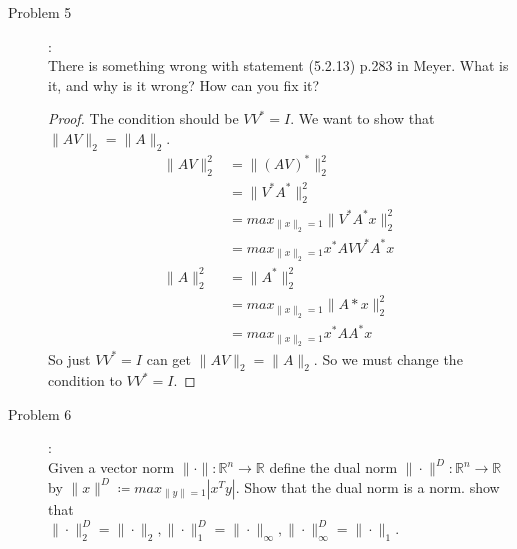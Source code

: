 \documentclass[a4paper]{article}
\begin{document}
\begin{description}
  \item[Problem 5]:\\
   There is something wrong with statement (5.2.13) p.283 in Meyer. What is it, and why is it wrong? How can you fix it?

  \begin{proof}
    The condition should be $VV^{*}=I$. We want to show that $\|AV\|_{2}=\|A\|_{2}$.
    \begin{align*}
      \|AV\|_{2}^{2}&=\|(AV)^{*}\|_{2}^{2} \\
      &=\|V^{*}A^{*}\|_{2}^{2}\\
      &=max_{\|x\|_{2}=1}\|V^{*}A^{*}x\|_{2}^{2}\\
      &=max_{\|x\|_{2}=1} x^{*}AVV^{*}A^{*}x\\
      \|A\|_{2}^{2}&=\|A^{*}\|_{2}^{2}\\
      &=max_{\|x\|_{2}=1}\|A*x\|_{2}^{2}\\
      &=max_{\|x\|_{2}=1}x^{*}AA^{*}x
    \end{align*}
    So just $VV^{*}=I$ can get $\|AV\|_{2}=\|A\|_{2}$. So we must change the condition to $VV^{*}=I$.
  \end{proof}

  \item[Problem 6]:\\
   Given a vector norm $\|\cdot\|:\mathbb{R}^{n}\to\mathbb{R}$ define the dual norm $\|\cdot\|^D:\mathbb{R}^{n}\to\mathbb{R}$ by $\|x\|^D\coloneqq max_{\|y\|=1}|x^Ty|$. Show that the dual norm is a norm. show that \\
  $\|\cdot\|_2^D=\|\cdot\|_2,\|\cdot\|_1^D=\|\cdot\|_\infty,\|\cdot\|_\infty^D=\|\cdot\|_1$.


\end{description}
\end{document}
